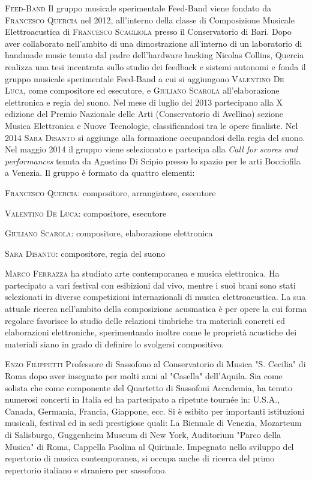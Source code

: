 \documentclass[9pt, twoside, a5paper]{extreport}
\newcommand{\biografia}[2]{%
\noindent \textsc{#1} %
#2 %
\medskip
}%
\begin{document}
\begin{multicols}{2}
\biografia{Feed-Band}{Il gruppo musicale sperimentale Feed-Band viene fondato da \textsc{Francesco Quercia} nel 2012, all'interno della classe di Composizione Musicale Elettroacustica di \textsc{Francesco Scagliola} presso il Conservatorio di Bari. Dopo aver collaborato nell'ambito di una dimostrazione all'interno di un laboratorio di handmade music tenuto dal padre dell'hardware hacking Nicolas Collins, Quercia realizza una tesi incentrata sullo studio dei feedback e sistemi autonomi e fonda il gruppo musicale sperimentale Feed-Band a cui si aggiungono \textsc{Valentino De Luca}, come compositore ed esecutore, e \textsc{Giuliano Scarola} all'elaborazione elettronica e regia del suono. Nel mese di luglio del 2013 partecipano alla X edizione del Premio Nazionale delle Arti (Conservatorio di Avellino) sezione Musica Elettronica e Nuove Tecnologie, classificandosi tra le opere finaliste. Nel 2014 \textsc{Sara Disanto} si aggiunge alla formazione occupandosi della regia del suono. Nel maggio 2014 il gruppo viene selezionato e partecipa alla \textit{Call for scores and performances} tenuta da Agostino Di Scipio presso lo spazio per le arti Bocciofila a Venezia.
Il gruppo è formato da quattro elementi:

\textsc{Francesco Quercia}: compositore, arrangiatore, esecutore

\textsc{Valentino De Luca}: compositore, esecutore

\textsc{Giuliano Scarola}: compositore, elaborazione elettronica

\textsc{Sara Disanto}: compositore, regia del suono}

\biografia{Marco Ferrazza}{ha studiato arte contemporanea e musica elettronica. Ha partecipato a vari festival con esibizioni dal vivo, mentre i suoi brani sono stati selezionati in diverse competizioni internazionali di musica elettroacustica.
La sua attuale ricerca nell'ambito della composizione acusmatica è per opere la cui forma regolare favorisce lo studio delle relazioni timbriche tra materiali concreti ed elaborazioni elettroniche, sperimentando inoltre come le proprietà acustiche dei materiali siano in grado di definire lo svolgersi compositivo.}

\biografia{Enzo Filippetti}{Professore di Sassofono al Conservatorio di Musica "S. Cecilia" di Roma dopo aver insegnato per molti anni al "Casella" dell’Aquila. Sia come solista che come componente del Quartetto di Sassofoni Accademia, ha tenuto numerosi concerti in Italia ed ha partecipato a ripetute tournée in: U.S.A., Canada, Germania, Francia, Giappone, ecc. Si è esibito per importanti istituzioni musicali, festival ed in sedi prestigiose quali: La Biennale di Venezia, Mozarteum di Salisburgo, Guggenheim Museum di New York, Auditorium "Parco della Musica" di Roma, Cappella Paolina al Quirinale. Impegnato nello sviluppo del repertorio di musica contemporanea, si occupa anche di ricerca del primo repertorio italiano e straniero per sassofono.}


\end{multicols}
\end{document}
